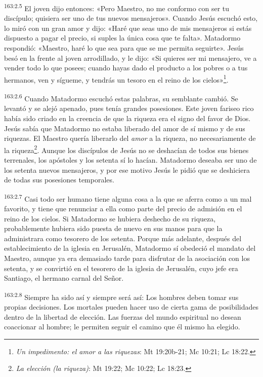 \par
\textsuperscript{163:2.5} El joven dijo entonces: «Pero Maestro, no me conformo con ser tu discípulo; quisiera ser uno de tus nuevos mensajeros». Cuando Jesús escuchó esto, lo miró con un gran amor y dijo: «Haré que seas uno de mis mensajeros si estás dispuesto a pagar el precio, si suples la única cosa que te falta». Matadormo respondió: «Maestro, haré lo que sea para que se me permita seguirte». Jesús besó en la frente al joven arrodillado, y le dijo: «Si quieres ser mi mensajero, ve a vender todo lo que posees; cuando hayas dado el producto a los pobres o a tus hermanos, ven y sígueme, y tendrás un tesoro en el reino de los cielos»\footnote{\textit{Un impedimento: el amor a las riquezas}: Mt 19:20b-21; Mc 10:21; Lc 18:22.}.

\par
\textsuperscript{163:2.6} Cuando Matadormo escuchó estas palabras, su semblante cambió. Se levantó y se alejó apenado, pues tenía grandes posesiones. Este joven fariseo rico había sido criado en la creencia de que la riqueza era el signo del favor de Dios. Jesús sabía que Matadormo no estaba liberado del amor de sí mismo y de sus riquezas. El Maestro quería liberarlo del \textit{amor} a la riqueza, no necesariamente de la riqueza\footnote{\textit{La elección (la riqueza)}: Mt 19:22; Mc 10:22; Lc 18:23.}. Aunque los discípulos de Jesús no se deshacían de todos sus bienes terrenales, los apóstoles y los setenta sí lo hacían. Matadormo deseaba ser uno de los setenta nuevos mensajeros, y por ese motivo Jesús le pidió que se deshiciera de todas sus posesiones temporales.

\par
\textsuperscript{163:2.7} Casi todo ser humano tiene alguna cosa a la que se aferra como a un mal favorito, y tiene que renunciar a ella como parte del precio de admisión en el reino de los cielos. Si Matadormo se hubiera deshecho de su riqueza, probablemente hubiera sido puesta de nuevo en sus manos para que la administrara como tesorero de los setenta. Porque más adelante, después del establecimiento de la iglesia en Jerusalén, Matadormo sí obedeció el mandato del Maestro, aunque ya era demasiado tarde para disfrutar de la asociación con los setenta, y se convirtió en el tesorero de la iglesia de Jerusalén, cuyo jefe era Santiago, el hermano carnal del Señor.

\par
\textsuperscript{163:2.8} Siempre ha sido así y siempre será así: Los hombres deben tomar sus propias decisiones. Los mortales pueden hacer uso de cierta gama de posibilidades dentro de la libertad de elección. Las fuerzas del mundo espiritual no desean coaccionar al hombre; le permiten seguir el camino que él mismo ha elegido.

